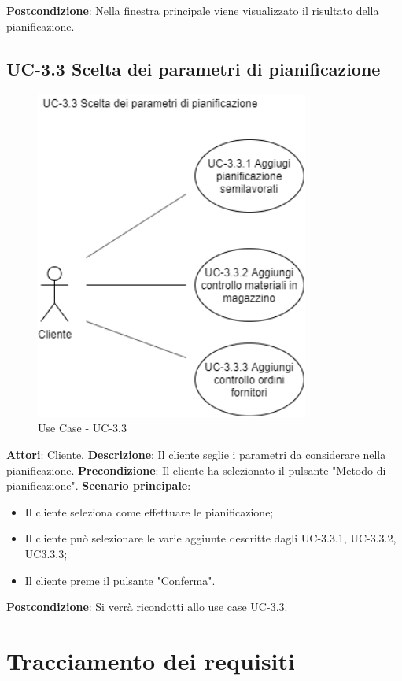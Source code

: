 \textbf{Postcondizione}: Nella finestra principale viene visualizzato il risultato della pianificazione.


\subsection*{UC-3.3 Scelta dei parametri di pianificazione}

\begin{figure}[H]
	\includegraphics[width=9cm]{immagini/UC2.png}
	\centering
	\caption{Use Case - UC-3.3}
\end{figure}

\textbf{Attori}: Cliente. \newline
\textbf{Descrizione}: Il cliente seglie i parametri da considerare nella pianificazione.\newline
\textbf{Precondizione}: Il cliente ha selezionato il pulsante "Metodo di pianificazione".\newline
\textbf{Scenario principale}: \begin{itemize}
    \item Il cliente seleziona come effettuare le pianificazione;
    \item Il cliente può selezionare le varie aggiunte descritte dagli UC-3.3.1, UC-3.3.2, UC3.3.3;
    \item Il cliente preme il pulsante "Conferma".
\end{itemize}
\textbf{Postcondizione}: Si verrà ricondotti allo use case UC-3.3.

\section{Tracciamento dei requisiti}

